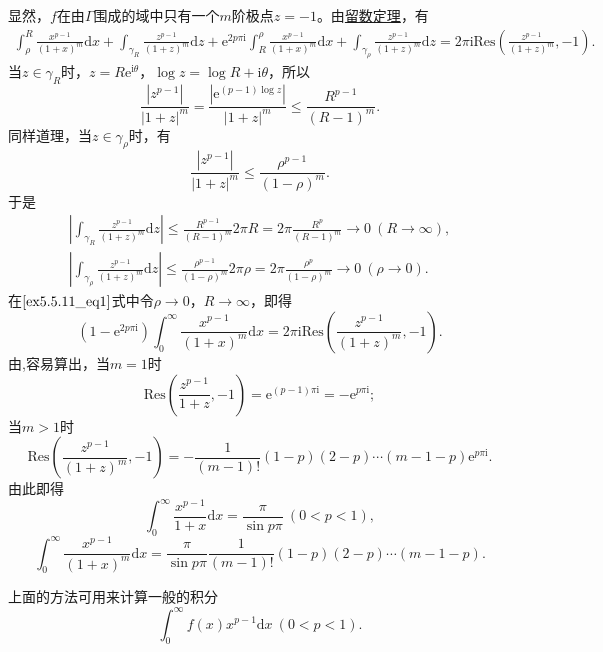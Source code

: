 \documentclass[../../main.tex]{subfiles}
\begin{document}
\begin{solution}
显然，\( f \)在由\( \Gamma \)围成的域中只有一个\( m \)阶极点\( z = -1 \)。由\hyperref[theorem:留数定理(残数定理)-定理5.4.9]{留数定理}，有
\begin{align}
\int_{\rho}^{R} \frac{x^{p - 1}}{(1 + x)^m} \mathrm{d}x + \int_{\gamma_R} \frac{z^{p - 1}}{(1 + z)^m} \mathrm{d}z + \mathrm{e}^{2p\pi \mathrm{i}} \int_{R}^{\rho} \frac{x^{p - 1}}{(1 + x)^m} \mathrm{d}x
+ \int_{\gamma_{\rho}} \frac{z^{p - 1}}{(1 + z)^m} \mathrm{d}z = 2\pi \mathrm{i} \mathrm{Res}\left( \frac{z^{p - 1}}{(1 + z)^m}, -1 \right). \label{ex5.5.11_eq1}
\end{align}
当\( z \in \gamma_R \)时，\( z = R\mathrm{e}^{\mathrm{i}\theta} \)，\( \log z = \log R + \mathrm{i}\theta \)，所以
\[
\frac{|z^{p - 1}|}{|1 + z|^m} = \frac{|\mathrm{e}^{(p - 1)\log z}|}{|1 + z|^m} \leqslant \frac{R^{p - 1}}{(R - 1)^m}.
\]
同样道理，当\( z \in \gamma_{\rho} \)时，有
\[
\frac{|z^{p - 1}|}{|1 + z|^m} \leqslant \frac{\rho^{p - 1}}{(1 - \rho)^m}.
\]
于是
\begin{gather*}
\left| \int_{\gamma_R} \frac{z^{p - 1}}{(1 + z)^m} \mathrm{d}z \right| \leqslant \frac{R^{p - 1}}{(R - 1)^m} 2\pi R
= 2\pi \frac{R^p}{(R - 1)^m}
\to 0 \ (R \to \infty),
\\
\left| \int_{\gamma_{\rho}} \frac{z^{p - 1}}{(1 + z)^m} \mathrm{d}z \right| \leqslant \frac{\rho^{p - 1}}{(1 - \rho)^m} 2\pi \rho
= 2\pi \frac{\rho^p}{(1 - \rho)^m}
\to 0 \ (\rho \to 0).
\end{gather*}
在\(\eqref{ex5.5.11_eq1}\)式中令\( \rho \to 0 \)，\( R \to \infty \)，即得
\[
(1 - \mathrm{e}^{2p\pi \mathrm{i}}) \int_{0}^{\infty} \frac{x^{p - 1}}{(1 + x)^m} \mathrm{d}x = 2\pi \mathrm{i} \mathrm{Res}\left( \frac{z^{p - 1}}{(1 + z)^m}, -1 \right).
\]
由,容易算出，当\( m = 1 \)时
\[
\mathrm{Res}\left( \frac{z^{p - 1}}{1 + z}, -1 \right) = \mathrm{e}^{(p - 1)\pi \mathrm{i}} = -\mathrm{e}^{p\pi \mathrm{i}};
\]
当\( m > 1 \)时
\[
\mathrm{Res}\left( \frac{z^{p - 1}}{(1 + z)^m}, -1 \right) = -\frac{1}{(m - 1)!}(1 - p)(2 - p)
\cdots (m - 1 - p) \mathrm{e}^{p\pi \mathrm{i}}.
\]
由此即得
\[
\int_{0}^{\infty} \frac{x^{p - 1}}{1 + x} \mathrm{d}x = \frac{\pi}{\sin p\pi} \ (0 < p < 1),
\]
\[
\int_{0}^{\infty} \frac{x^{p - 1}}{(1 + x)^m} \mathrm{d}x = \frac{\pi}{\sin p\pi} \frac{1}{(m - 1)!}(1 - p)(2 - p)
\cdots (m - 1 - p).
\]
\end{solution}
\begin{remark}
上面的方法可用来计算一般的积分
\[
\int_{0}^{\infty} f(x) x^{p - 1} \mathrm{d}x \ (0 < p < 1).
\]
\end{remark}
\end{document}
